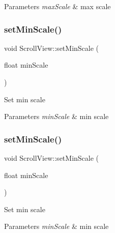 \begin{DoxyParams}{Parameters}
{\em max\+Scale} & max scale \\
\hline
\end{DoxyParams}
\mbox{\label{classScrollView_a4037050171ea3ffcd365024ef3e74009}} 
\subsubsection{\texorpdfstring{set\+Min\+Scale()}{setMinScale()}\hspace{0.1cm}{\footnotesize\ttfamily [1/2]}}
{\footnotesize\ttfamily void Scroll\+View\+::set\+Min\+Scale (\begin{DoxyParamCaption}\item[{float}]{min\+Scale }\end{DoxyParamCaption})\hspace{0.3cm}{\ttfamily [inline]}}

Set min scale


\begin{DoxyParams}{Parameters}
{\em min\+Scale} & min scale \\
\hline
\end{DoxyParams}
\mbox{\label{classScrollView_a4037050171ea3ffcd365024ef3e74009}} 
\subsubsection{\texorpdfstring{set\+Min\+Scale()}{setMinScale()}\hspace{0.1cm}{\footnotesize\ttfamily [2/2]}}
{\footnotesize\ttfamily void Scroll\+View\+::set\+Min\+Scale (\begin{DoxyParamCaption}\item[{float}]{min\+Scale }\end{DoxyParamCaption})\hspace{0.3cm}{\ttfamily [inline]}}

Set min scale


\begin{DoxyParams}{Parameters}
{\em min\+Scale} & min scale \\
\hline
\end{DoxyParams}
\mbox{\label{classScrollView_a9c9101d58eeb922bfe64b9b4cd01b314}} 
